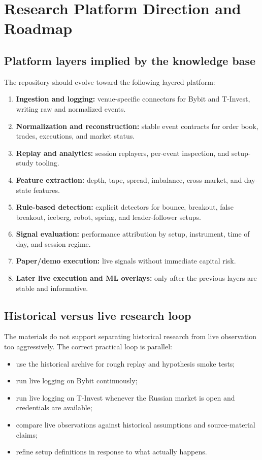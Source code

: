 \section{Research Platform Direction and Roadmap}

\subsection{Platform layers implied by the knowledge base}

The repository should evolve toward the following layered platform:

\begin{enumerate}[leftmargin=1.5em]
\item \textbf{Ingestion and logging:} venue-specific connectors for Bybit and T-Invest, writing raw and normalized events.
\item \textbf{Normalization and reconstruction:} stable event contracts for order book, trades, executions, and market status.
\item \textbf{Replay and analytics:} session replayers, per-event inspection, and setup-study tooling.
\item \textbf{Feature extraction:} depth, tape, spread, imbalance, cross-market, and day-state features.
\item \textbf{Rule-based detection:} explicit detectors for bounce, breakout, false breakout, iceberg, robot, spring, and leader-follower setups.
\item \textbf{Signal evaluation:} performance attribution by setup, instrument, time of day, and session regime.
\item \textbf{Paper/demo execution:} live signals without immediate capital risk.
\item \textbf{Later live execution and ML overlays:} only after the previous layers are stable and informative.
\end{enumerate}

\subsection{Historical versus live research loop}

The materials do not support separating historical research from live observation too aggressively. The correct practical loop is parallel:

\begin{itemize}[leftmargin=1.5em]
\item use the historical archive for rough replay and hypothesis smoke tests;
\item run live logging on Bybit continuously;
\item run live logging on T-Invest whenever the Russian market is open and credentials are available;
\item compare live observations against historical assumptions and source-material claims;
\item refine setup definitions in response to what actually happens.
\end{itemize}


